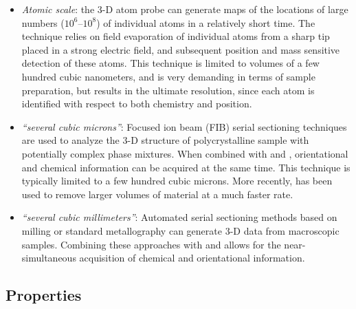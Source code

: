 \begin{itemize}
\item \textit{Atomic scale}:  the  3-D  atom probe \cite{seidman2000a,miller2004a,hono2005a} can generate maps of the locations of large numbers ($10^6$--$10^8$) of individual atoms in a relatively short time. The technique relies on field evaporation of individual atoms from a sharp tip placed in a strong electric field, and subsequent position and mass sensitive detection of these atoms.  This technique is limited to volumes of a few hundred cubic nanometers, and is very demanding in terms of sample preparation, but results in the ultimate resolution, since each atom is identified with respect to both chemistry and position.

\item \textit{``several cubic microns''}:  Focused ion beam (FIB) serial sectioning techniques \cite{dunn1999a,uchic2006a} are used to analyze the 3-D  structure of polycrystalline sample with potentially complex phase mixtures.  When combined with  and , orientational and chemical information can be acquired at the same time.  This technique is typically limited to a few hundred cubic microns.  More recently,  \cite{Echlin2015} has been used to remove larger volumes of material at a much faster rate.

\item \textit{``several cubic millimeters''}: Automated serial sectioning methods based on milling \cite{alkemper2001a} or standard metallography \cite{spowart2003a} can generate  3-D  data from macroscopic samples. Combining these approaches  with  and  allows for the near-simultaneous acquisition of chemical and orientational information.
\end{itemize}

\subsection{Properties}

